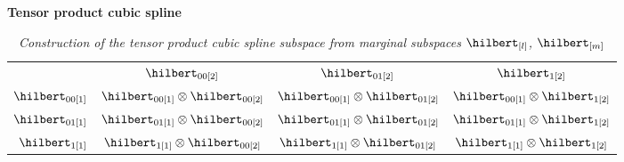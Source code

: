 \begin{example}{\textbf {Tensor product cubic spline}}
\begin{table}[H]
\centering %
\begin{tabular}{r|c|c|c|} %
\multicolumn{1}{c}{} & \multicolumn{1}{c}{	$\hilbert_{00\left[2\right]}$}	&	\multicolumn{1}{c}{$\hilbert_{01\left[2\right]}$}	&\multicolumn{1}{c}{ $\hilbert_{1\left[2\right]}$}\\ [1.5ex] 
\cline{2-4}  %
$\hilbert_{00\left[1\right]}$		& $\hilbert_{00\left[1\right]}\otimes \hilbert_{00\left[2\right]}$ 	&	$\hilbert_{00\left[1\right]}	\otimes \hilbert_{01\left[2\right]} $	&	$\hilbert_{00\left[1\right]}	\otimes \hilbert_{1\left[2\right]}$   \\ [1.5ex] 
$\hilbert_{01\left[1\right]}$		& $\hilbert_{01\left[1\right]} \otimes \hilbert_{00\left[2\right]}$			& 	$\hilbert_{01\left[1\right]} \otimes \hilbert_{01\left[2\right]}$   &   $\hilbert_{01\left[1\right]} \otimes \hilbert_{1\left[2\right]}$\\ [1.5ex] 
 $\hilbert_{1\left[1\right]}$	& 	 $\hilbert_{1\left[1\right]} \otimes \hilbert_{00\left[2\right]}$	&	$\hilbert_{1\left[1\right]} \otimes \hilbert_{01\left[2\right]}$ 	&	$\hilbert_{1\left[1\right]} \otimes \hilbert_{1\left[2\right]}$ \\ [1.5ex] 
\cline{2-4}
\end{tabular}
\caption{\textit{Construction of the tensor product cubic spline subspace from marginal subspaces $\hilbert_{\left[l\right]}$, $\hilbert_{\left[m\right]}$}} %
\label{table:tensor-product-cubic-spline-RKHS-table}
\end{table}


\end{example}
